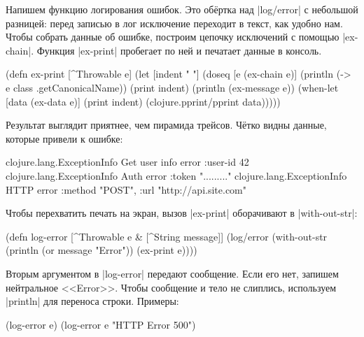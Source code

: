 Напишем функцию логирования ошибок. Это об\"{е}ртка над \spverb|log/error| с
небольшой разницей: перед записью в лог исключение переходит в текст, как удобно
нам. Чтобы собрать данные об ошибке, построим цепочку исключений с помощью
\spverb|ex-chain|. Функция \spverb|ex-print| пробегает по ней и печатает данные
в консоль.


\begin{english}
  \begin{clojure}
(defn ex-print
  [^Throwable e]
  (let [indent "  "]
    (doseq [e (ex-chain e)]
      (println (-> e class .getCanonicalName))
      (print indent)
      (println (ex-message e))
      (when-let [data (ex-data e)]
        (print indent)
        (clojure.pprint/pprint data)))))
  \end{clojure}
\end{english}

Результат выглядит приятнее, чем пирамида трейсов. Ч\"{е}тко видны данные,
которые привели к ошибке:

\begin{english}
  \begin{clojure}
clojure.lang.ExceptionInfo
  Get user info error
  {:user-id 42}
clojure.lang.ExceptionInfo
  Auth error
  {:token "........."}
clojure.lang.ExceptionInfo
  HTTP error
  {:method "POST", :url "http://api.site.com"}
  \end{clojure}
\end{english}


Чтобы перехватить печать на экран, вызов \spverb|ex-print| оборачивают в
\spverb|with-out-str|:

\begin{english}
  \begin{clojure}
(defn log-error
  [^Throwable e & [^String message]]
  (log/error
   (with-out-str
     (println (or message "Error"))
     (ex-print e))))
  \end{clojure}
\end{english}

Вторым аргументом в \spverb|log-error| передают сообщение. Если его нет, запишем
нейтральное <<Error>>. Чтобы сообщение и тело не слиплись, используем
\spverb|println| для переноса строки. Примеры:

\begin{english}
  \begin{clojure}
(log-error e)
(log-error e "HTTP Error 500")
  \end{clojure}
\end{english}

